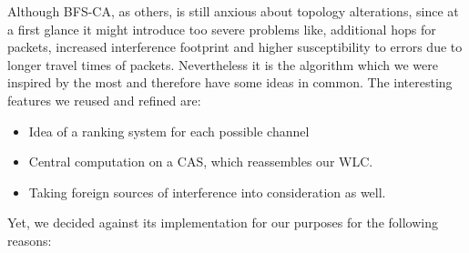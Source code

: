    Although \ac{BFS-CA}, as others, is still anxious about topology alterations, since at a first glance it might introduce too severe problems like, 
    additional hops for packets, increased interference footprint and higher susceptibility to errors due to longer travel times of packets.
    Nevertheless it is the algorithm which we were inspired by the most and therefore have some ideas in common.
    The interesting features we reused and refined are:
    
    \begin{itemize}
     \item Idea of a ranking system for each possible channel
     
     \item Central computation on a \ac{CAS}, which reassembles our \ac{WLC}.
     
     \item Taking foreign sources of interference into consideration as well.
     
    \end{itemize}
    
\newpage
    
    Yet, we decided against its implementation for our purposes for the following reasons:
    
